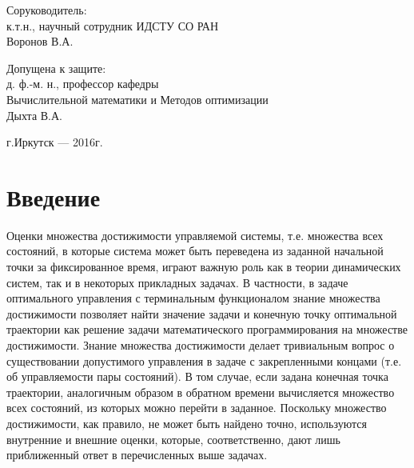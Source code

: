\documentclass[a4paper,12pt]{article}
\begin{document}
\begin{titlepage}
\begin{singlespacing}
\begin{flushright}
{                \vspace{1em}

                Соруководитель:\\
                к.т.н., научный сотрудник ИДСТУ СО РАН\\
                \underline{\phantom{Четкая подпись}} Воронов В.А. 

                \vspace{1em}

                Допущена к защите:\\
                д. ф.-м. н., профессор кафедры\\ Вычислительной математики и Методов оптимизации \\ 
                \underline{\phantom{Четкая подпись}} Дыхта В.А. 

            }
        \end{flushright}

        \vspace{\fill}

        \begin{center}
            г.Иркутск --- 2016г.
        \end{center}

    \end{singlespacing}
\end{titlepage}

\tableofcontents
\pagebreak
\section*{Введение}
\label{intro}

Оценки множества достижимости управляемой системы, т.е. множества всех
состояний, в которые система может быть переведена из заданной начальной
точки за фиксированное время, играют важную роль как в теории динамических
систем, так и в некоторых прикладных задачах.  В частности, в задаче
оптимального управления с терминальным функционалом знание множества
достижимости позволяет найти значение задачи и конечную точку оптимальной
траектории как решение задачи математического программирования на множестве
достижимости. Знание множества достижимости делает тривиальным вопрос о
существовании допустимого управления в задаче с закрепленными концами (т.е.
об управляемости пары состояний).  В том случае, если задана конечная точка
траектории, аналогичным образом в обратном времени вычисляется множество
всех состояний, из которых можно перейти в заданное.  Поскольку множество
достижимости, как правило, не может быть найдено точно, используются
внутренние и внешние оценки, которые, соответственно, дают лишь
приближенный ответ в перечисленных выше задачах.
\end{document}
